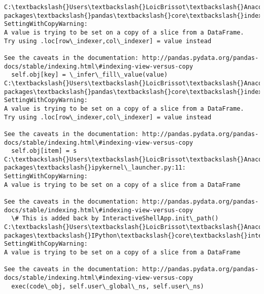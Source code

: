 \documentclass[11pt]{article}
\begin{document}
    \begin{Verbatim}[commandchars=\\\{\}]
C:\textbackslash{}Users\textbackslash{}LoicBrissot\textbackslash{}Anaconda3\textbackslash{}lib\textbackslash{}site-packages\textbackslash{}pandas\textbackslash{}core\textbackslash{}indexing.py:362: SettingWithCopyWarning: 
A value is trying to be set on a copy of a slice from a DataFrame.
Try using .loc[row\_indexer,col\_indexer] = value instead

See the caveats in the documentation: http://pandas.pydata.org/pandas-docs/stable/indexing.html\#indexing-view-versus-copy
  self.obj[key] = \_infer\_fill\_value(value)
C:\textbackslash{}Users\textbackslash{}LoicBrissot\textbackslash{}Anaconda3\textbackslash{}lib\textbackslash{}site-packages\textbackslash{}pandas\textbackslash{}core\textbackslash{}indexing.py:543: SettingWithCopyWarning: 
A value is trying to be set on a copy of a slice from a DataFrame.
Try using .loc[row\_indexer,col\_indexer] = value instead

See the caveats in the documentation: http://pandas.pydata.org/pandas-docs/stable/indexing.html\#indexing-view-versus-copy
  self.obj[item] = s
C:\textbackslash{}Users\textbackslash{}LoicBrissot\textbackslash{}Anaconda3\textbackslash{}lib\textbackslash{}site-packages\textbackslash{}ipykernel\_launcher.py:11: SettingWithCopyWarning: 
A value is trying to be set on a copy of a slice from a DataFrame

See the caveats in the documentation: http://pandas.pydata.org/pandas-docs/stable/indexing.html\#indexing-view-versus-copy
  \# This is added back by InteractiveShellApp.init\_path()
C:\textbackslash{}Users\textbackslash{}LoicBrissot\textbackslash{}Anaconda3\textbackslash{}lib\textbackslash{}site-packages\textbackslash{}IPython\textbackslash{}core\textbackslash{}interactiveshell.py:2963: SettingWithCopyWarning: 
A value is trying to be set on a copy of a slice from a DataFrame

See the caveats in the documentation: http://pandas.pydata.org/pandas-docs/stable/indexing.html\#indexing-view-versus-copy
  exec(code\_obj, self.user\_global\_ns, self.user\_ns)

    \end{Verbatim}
\end{document}
